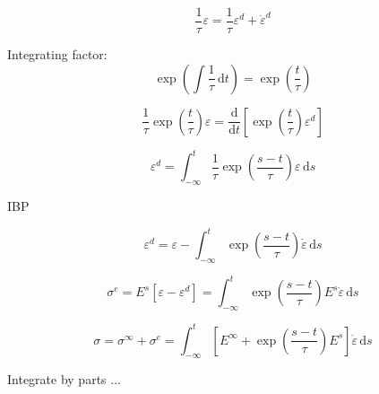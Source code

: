 \documentclass[12pt]{article}
\renewcommand{\d}{\text{d}}
\newcommand{\der}[2]{\dfrac{\text{d} #1}{\text{d} #2}}
\begin{document}
\begin{equation}
	\dfrac{1}{\tau}\varepsilon =  \dfrac{1}{\tau}\varepsilon^{d} + \dot{\varepsilon}^{d}
\end{equation}

Integrating factor:
\begin{equation}
	\exp\left(\int\dfrac{1}{\tau}\,\d t\right) = 	\exp\left(\dfrac{t}{\tau}\right) 
\end{equation}

\begin{equation}
	\dfrac{1}{\tau}\exp\left(\dfrac{t}{\tau}\right) \varepsilon =  \der{ }{t}\left[\exp\left(\dfrac{t}{\tau}\right) \varepsilon^{d} \right] 
\end{equation}

\begin{equation}
	\varepsilon^{d} = \int_{-\infty}^{t}\dfrac{1}{\tau}\exp\left(\dfrac{s-t}{\tau}\right)\varepsilon \,\d s
\end{equation}

IBP

\begin{equation}
		\varepsilon^{d} = \varepsilon - \int_{-\infty}^{t} \exp\left(\dfrac{s-t}{\tau}\right)\dot{\varepsilon} \,\d s
\end{equation}

\begin{equation}
	\sigma^{e} = E^{s}\left[\varepsilon-\varepsilon^{d}\right] =  \int_{-\infty}^{t} \exp\left(\dfrac{s-t}{\tau}\right)E^{s}\dot{\varepsilon} \,\d s
\end{equation}

\begin{equation}
	\sigma = \sigma^{\infty} + \sigma^{e} = \int_{-\infty}^{t} \left[E^{\infty} + \exp\left(\dfrac{s-t}{\tau}\right)E^{s}\right]\dot{\varepsilon} \,\d s
\end{equation}

Integrate by parts ...
\end{document}
